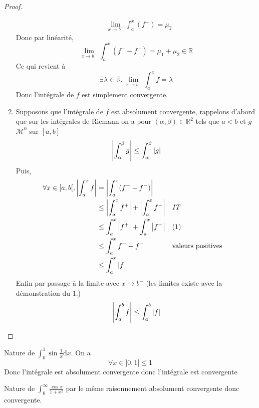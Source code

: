 \documentclass[11pt,colorlinks]{book}
\theoremstyle{mytheoremstyle}
\theoremstyle{mytheoremstyle}
\theoremstyle{mytheoremstyle}
\theoremstyle{mytheoremstyle}
\theoremstyle{mytheoremstyle}
\theoremstyle{mytheoremstyle}
\theoremstyle{mytheoremstyle}
\theoremstyle{mytheoremstyle}
\theoremstyle{myproblemstyle}
\def\mbb#1{\mathbb{#1}}
\def\bR{\mbb{R}}
\def\mM{\mathcal{M}}
\begin{document}
\begin{theorem}[Comparaison]
\begin{proof}
\begin{enumerate}
\begin{align*}
                                         &\lim_{x \to b^{-}} \int_a^x (f^{-}) = \mu_2
      \end{align*}
      Donc par linéarité, 
      \begin{equation*}
        \lim_{x \to b^{-}} \int_a^x (f^{+}-f^{-}) = \mu_1 + \mu_2 \in \bR
      \end{equation*}
      Ce qui revient à 
      \begin{equation*}
        \exists \lambda \in \bR, \lim_{x \to b^{-}} \int_a^x f = \lambda
      \end{equation*}
      Donc l'intégrale de $f$ est simplement convergente.\newline

        \item Supposons que l'intégrale de $f$ est absolument convergente, rappelons d'abord que sur les intégrales de Riemann on a 
      pour $(\alpha,\beta) \in \bR^2$ tels que $a < b$ et $g$ $\mM^0$ sur $[a,b]$
      \begin{equation}
        \abs{\int_{\alpha}^{\beta} g} \leq \int_{\alpha}^{\beta} \abs{g}
      \end{equation}
      Puis,
      \begin{align*}
        \forall x \in [a,b[, \abs{\int_a^x f} &= \abs{\int_a^x (f^{+} - f^{-})} \\ 
        &\leq \abs{\int_a^x f^{+}} + \abs{\int_a^x f^{-}} && \textit{IT} \\ 
        &\leq \int_a^x \abs{f^{+}} + \int_a^x \abs{f^{-}} && (1)\\ 
        &\leq \int_a^x f^{+} + f^{-} && \text{valeurs positives} \\
        &\leq \int_a^x \abs{f}
      \end{align*}
      Enfin par passage à la limite avec $x \to b^{-}$ (les limites existe avec la démonstration du 1.)
      \begin{equation*}
        \abs{\int_a^b f} \leq \int_a^b \abs{f}
      \end{equation*}
    \end{enumerate}
    \end{proof}
  \end{theorem}
  \begin{ex}
    Nature de $\int_0^1 \sin \frac{1}{x} \text{d}x$. 
    On a 
    \begin{equation*}
      \forall x \in ]0,1] \leq 1 
    \end{equation*}
    Donc l'intégrale est absolument convergente donc l'intégrale est convergente
  \end{ex}
  \begin{ex}
    Nature de $\int_0^{\infty} \frac{\cos x}{1+x^2}$ par le même raisonnement absolument convergente donc convergente.
  \end{ex}
\end{document}
